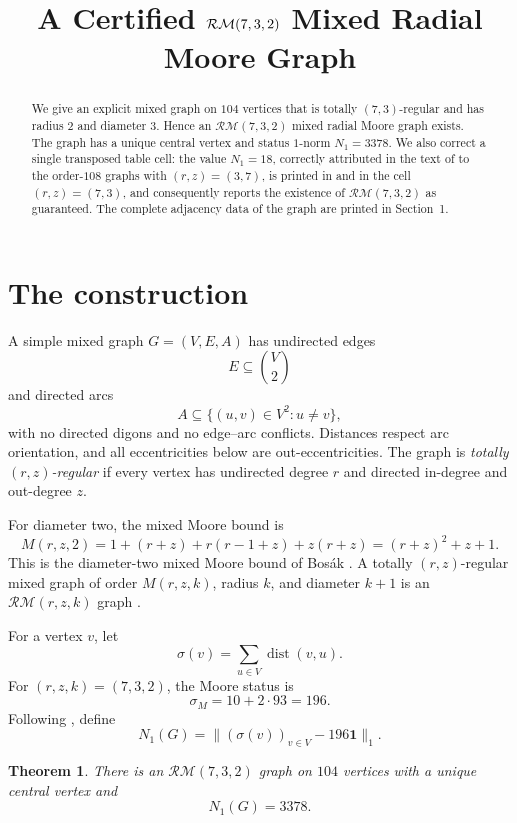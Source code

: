 \documentclass[11pt]{amsart}
\title[A certified $\RM(7,3,2)$ graph]
{A Certified $\RM(7,3,2)$ Mixed Radial Moore Graph}
\date{}
\newtheorem{theorem}{Theorem}
\theoremstyle{remark}
\newcommand{\RM}{\mathcal{RM}}
\newcommand{\dist}{\operatorname{dist}}
\begin{document}
\begin{abstract}
We give an explicit mixed graph on $104$ vertices that is totally
$(7,3)$-regular and has radius $2$ and diameter $3$. Hence an
$\RM(7,3,2)$ mixed radial Moore graph exists. The graph has a unique
central vertex and status $1$-norm $N_1=3378$. We also correct a
single transposed table cell: the value $N_1=18$, correctly attributed
in the text of \cite{CLC2023} to the order-$108$ graphs with
$(r,z)=(3,7)$, is printed in \cite[Table~3]{CLC2023} and
\cite[Table~4.2]{ACL2026} in the cell $(r,z)=(7,3)$, and
\cite[p.~88]{ACL2026} consequently reports the existence of
$\RM(7,3,2)$ as guaranteed. The complete adjacency data of the graph
are printed in Section~1.
\end{abstract}

\maketitle

\section{The construction}

A simple mixed graph $G=(V,E,A)$ has undirected edges
\[
E\subseteq\binom{V}{2}
\]
and directed arcs
\[
A\subseteq\{(u,v)\in V^2:u\ne v\},
\]
with no directed digons and no edge--arc conflicts. Distances respect
arc orientation, and all eccentricities below are out-eccentricities.
The graph is \emph{totally $(r,z)$-regular} if every vertex has
undirected degree $r$ and directed in-degree and out-degree $z$.

For diameter two, the mixed Moore bound is
\begin{equation}\label{eq:moore}
M(r,z,2)
 =1+(r+z)+r(r-1+z)+z(r+z)
 =(r+z)^2+z+1.
\end{equation}
This is the diameter-two mixed Moore bound of Bos\'ak
\cite{Bosak1979}. A totally $(r,z)$-regular mixed graph of order
$M(r,z,k)$, radius $k$, and diameter $k+1$ is an $\RM(r,z,k)$ graph
\cite{CLC2023,ACL2026}.

For a vertex $v$, let
\[
\sigma(v)=\sum_{u\in V}\dist(v,u).
\]
For $(r,z,k)=(7,3,2)$, the Moore status is
\[
\sigma_M=10+2\cdot93=196.
\]
Following \cite{CLC2023}, define
\[
N_1(G)
 =\bigl\|(\sigma(v))_{v\in V}-196\mathbf 1\bigr\|_1.
\]

\begin{theorem}\label{thm:main}
There is an $\RM(7,3,2)$ graph on $104$ vertices with a unique central
vertex and
\[
N_1(G)=3378.
\]
\end{theorem}
\end{document}
